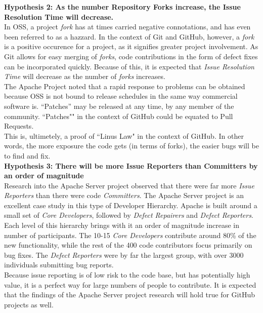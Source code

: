 \documentclass{proc}
\begin{document}
\textbf{Hypothesis 2: As the number Repository Forks increase, the Issue Resolution Time will decrease.}\\
In OSS, a project \emph{fork} has at times carried negative connotations, and has even been referred to as a hazzard\cite{kogut2001open}. In the context of Git and GitHub, however, a \emph{fork} is a positive occurence for a project, as it signifies greater project involvement. As Git allows for easy merging of \emph{forks}, code contributions in the form of defect fixes can be incorporated quickly. Because of this, it is expected that \emph{Issue Resolution Time} will decrease as the number of \emph{forks} increases.\\

The Apache Project noted that a rapid response to problems can be obtained because OSS is not bound to release schedules in the same way commercial software is. ``Patches'' may be released at any time, by any member of the community\cite{mockus2000case}. ``Patches"" in the context of GitHub could be equated to Pull Requests.\\

This is, ultimetely, a proof of ``Linus Law"\cite{raymond1999cathedral} in the context of GitHub. In other words, the more exposure the code gets (in terms of forks), the easier bugs will be to find and fix.\\

\textbf{Hypothesis 3: There will be more Issue Reporters than Committers by an order of magnitude}\\
Research into the Apache Server project observed that there were far more \emph{Issue Reporters} than there were code \emph{Committers}\cite{mockus2000case}. The Apache Server project is an excellent case study in this type of Developer Hierarchy. Apache is built around a small set of {\it Core Developers}, followed by {\it Defect Repairers} and {\it Defect Reporters}. Each level of this hierarchy brings with it an order of magnitude increase in number of participants. The 10-15 {\it Core Developers} contribute around 80\% of the new functionality, while the rest of the 400 code contributors focus primarily on bug fixes. The {\it Defect Reporters} were by far the largest group, with over 3000 individuals submitting bug reports.\\

Because issue reporting is of low risk to the code base, but has potentially high value, it is a perfect way for large numbers of people to contribute. It is expected that the findings of the Apache Server project research will hold true for GitHub projects as well.\\
\end{document}
